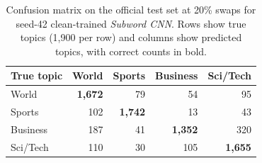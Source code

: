 \begin{table}[H]\centering\normalsize\setlength{\tabcolsep}{5pt}
\begin{tabular}{lrrrr}\toprule
True topic & World & Sports & Business & Sci/Tech \\\midrule
World & \textbf{1,672} & 79 & 54 & 95 \\
Sports & 102 & \textbf{1,742} & 13 & 43 \\
Business & 187 & 41 & \textbf{1,352} & 320 \\
Sci/Tech & 110 & 30 & 105 & \textbf{1,655} \\
\bottomrule
\end{tabular}
\caption[Subword CNN confusion matrix]{Confusion matrix on the official test set at 20\% swaps for seed-42 clean-trained \textit{Subword CNN}. Rows show true topics (1,900 per row) and columns show predicted topics, with correct counts in bold.}\label{tab:confusion-review}
\end{table}

